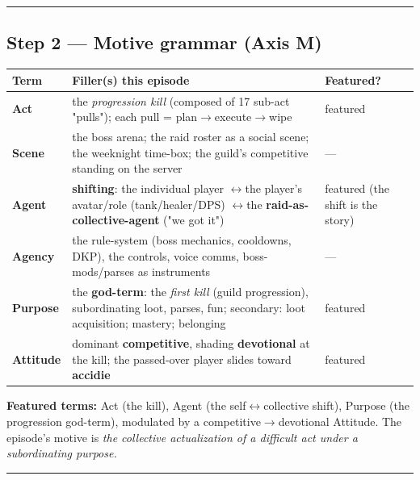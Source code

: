 \documentclass[11pt]{report}
\begin{document}
\vspace{0.4em}\hrule\vspace{0.8em}


\subsection{Step 2 — Motive grammar (Axis M)}


\begin{table}[H]
\renewcommand{\arraystretch}{1.25}
\begin{tabularx}{\textwidth}{>{\RaggedRight\arraybackslash}X>{\RaggedRight\arraybackslash}X>{\RaggedRight\arraybackslash}X}
\toprule
Term & Filler(s) this episode & Featured? \\
\midrule
\textbf{Act} & the \textit{progression kill} (composed of 17 sub-act "pulls"); each pull = plan$\rightarrow$\allowbreak execute$\rightarrow$\allowbreak wipe & featured \\
\textbf{Scene} & the boss arena; the raid roster as a social scene; the weeknight time-box; the guild's competitive standing on the server & — \\
\textbf{Agent} & \textbf{shifting}: the individual player $\leftrightarrow$\allowbreak  the player's avatar/role (tank/healer/DPS) $\leftrightarrow$\allowbreak  the \textbf{raid-as-collective-agent} ("we got it") & featured (the shift is the story) \\
\textbf{Agency} & the rule-system (boss mechanics, cooldowns, DKP), the controls, voice comms, boss-mods/parses as instruments & — \\
\textbf{Purpose} & the \textbf{god-term}: the \textit{first kill} (guild progression), subordinating loot, parses, fun; secondary: loot acquisition; mastery; belonging & featured \\
\textbf{Attitude} & dominant \textbf{competitive}, shading \textbf{devotional} at the kill; the passed-over player slides toward \textbf{accidie} & featured \\
\bottomrule
\end{tabularx}
\end{table}


\textbf{Featured terms:} Act (the kill), Agent (the self$\leftrightarrow$\allowbreak collective shift), Purpose (the progression god-term), modulated by a competitive$\rightarrow$\allowbreak devotional Attitude. The episode's motive is \textit{the collective actualization of a difficult act under a subordinating purpose.}


\vspace{0.4em}\hrule\vspace{0.8em}
\end{document}
